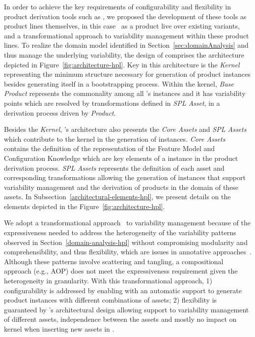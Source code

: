 In order to achieve the key requirements of configurability and flexibility in product derivation tools such as \hp{}, we proposed the development of these tools as product lines themselves, in this case~\hpl{} as a product live over existing  \hp{} variants, and a transformational approach to variability management within these product lines. To realize the domain model identified in Section~\ref{sec:domainAnalysis} and thus manage the underlying variability, the design of \hpl{} comprises the architecture depicted in Figure~\ref{fig:architecture-hpl}. Key in this architecture is the \textit{Kernel} representing the minimum structure necessary for generation of product \hpl{} instances besides generating itself in a bootstrapping process. Within the kernel,  \emph{Base Product} represents the commonality among all \hpl{}'s instances and it has  variability points which are resolved by transformations defined in \emph{\hp{} SPL Asset}, in a derivation process driven by \emph{\hp{} Product}.

Besides the \textit{Kernel}, \hpl's architecture also presents the \textit{Core Assets} and \textit{SPL Assets} which contribute to the kernel in the generation of \hpl{} instances. \textit{Core Assets} contains the definition of the representation of the Feature Model and Configuration Knowledge which are key elements of a \hpl{} instance in the  product derivation process. \textit{SPL Assets} represents the definition of each asset and corresponding transformations allowing the generation of \hpl{} instances that support variability management and the derivation of products in the domain of these assets. In Subsection~\ref{architectural-elements-hpl}, we present details on the elements depicted in the Figure~\ref{fig:architecture-hpl}.


We adopt a transformational approach~\cite{deltaSchaefer} to variability management because of the expressiveness needed to address the heterogeneity of the variability patterns observed in Section~\ref{domain-analysis-hpl} without compromising modularity and comprehensibility, and thus flexibility, which are issues in annotative approaches~\cite{kastner:2008}. Although these patterns involve scattering and tangling, a compositional approach (e.g., AOP) does not meet the expressiveness requirement given the heterogeneity in granularity. With this transformational approach, 1) configurability is addressed by enabling \hpl{} with an automatic support to generate product instances with different combinations of assets; 2) flexibility is guaranteed by \hpl{}'s architectural design allowing support to variability management of different assets, independence between the assets and mostly no impact on kernel when inserting new assets in \hpl.

